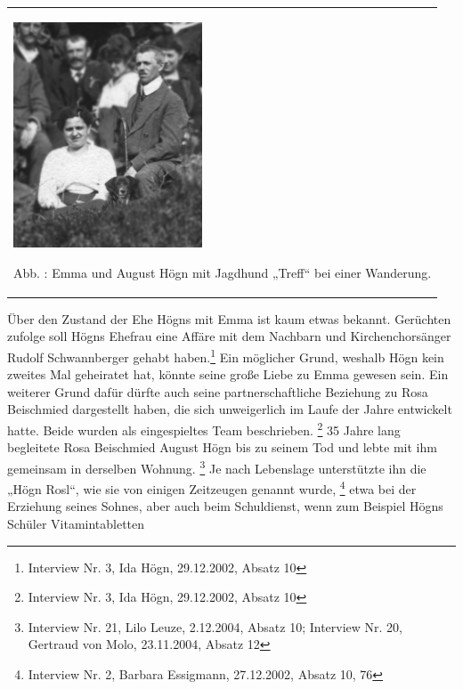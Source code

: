 \begin{center}
\begin{minipage}{5.992cm}
\begin{center}
\tablefirsthead{}
\tablehead{}
\tabletail{}
\tablelasttail{}
\begin{supertabular}{m{5.7920003cm}}

\includegraphics[width=5.609cm,height=6.705cm]{pictures/zulassungsarbeit-img024.jpg}

Abb. : Emma und August Högn mit Jagdhund
„Treff“ bei einer Wanderung.\\
\end{supertabular}
\end{center}
\end{minipage}
\end{center}
Über den Zustand der Ehe Högns mit Emma ist kaum etwas bekannt.
Gerüchten zufolge soll Högns Ehefrau eine Affäre mit dem Nachbarn und
Kirchenchorsänger Rudolf Schwannberger gehabt haben.\footnote{
Interview Nr. 3, Ida Högn, 29.12.2002, Absatz 10} Ein möglicher Grund,
weshalb Högn kein zweites Mal geheiratet hat, könnte seine große Liebe
zu Emma gewesen sein. Ein weiterer Grund dafür dürfte auch seine
partnerschaftliche Beziehung zu Rosa Beischmied dargestellt haben, die
sich unweigerlich im Laufe der Jahre entwickelt hatte. Beide wurden als
eingespieltes Team beschrieben. \footnote{Interview Nr. 3, Ida Högn,
29.12.2002, Absatz 10} 35 Jahre lang begleitete Rosa Beischmied August
Högn bis zu seinem Tod und lebte mit ihm gemeinsam in derselben
Wohnung. \footnote{Interview Nr. 21, Lilo Leuze, 2.12.2004, Absatz 10;
Interview Nr. 20, Gertraud von Molo, 23.11.2004, Absatz 12} Je nach
Lebenslage unterstützte ihn die „Högn Rosl“, wie sie von einigen
Zeitzeugen genannt wurde, \footnote{Interview Nr. 2, Barbara Essigmann,
27.12.2002, Absatz 10, 76} etwa bei der Erziehung seines Sohnes, aber
auch beim Schuldienst, wenn zum Beispiel Högns Schüler Vitamintabletten
